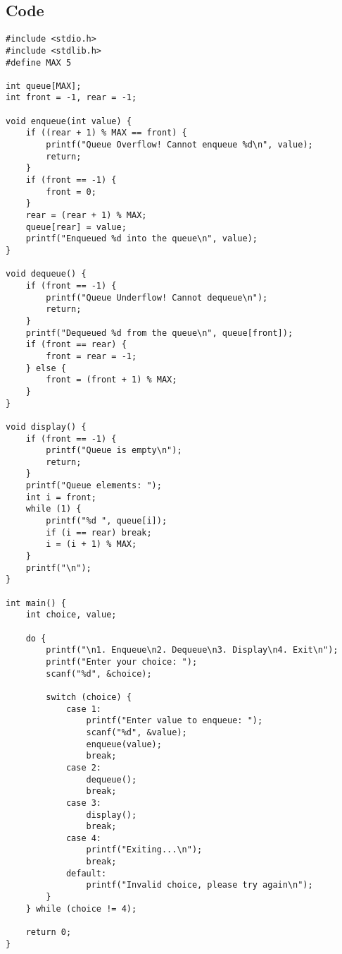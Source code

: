 \documentclass[12pt,a4paper]{article}
\begin{document}
\subsection*{Code}
\begin{lstlisting}
#include <stdio.h>
#include <stdlib.h>
#define MAX 5

int queue[MAX];
int front = -1, rear = -1;

void enqueue(int value) {
    if ((rear + 1) % MAX == front) {
        printf("Queue Overflow! Cannot enqueue %d\n", value);
        return;
    }
    if (front == -1) {
        front = 0;
    }
    rear = (rear + 1) % MAX;
    queue[rear] = value;
    printf("Enqueued %d into the queue\n", value);
}

void dequeue() {
    if (front == -1) {
        printf("Queue Underflow! Cannot dequeue\n");
        return;
    }
    printf("Dequeued %d from the queue\n", queue[front]);
    if (front == rear) {
        front = rear = -1;
    } else {
        front = (front + 1) % MAX;
    }
}

void display() {
    if (front == -1) {
        printf("Queue is empty\n");
        return;
    }
    printf("Queue elements: ");
    int i = front;
    while (1) {
        printf("%d ", queue[i]);
        if (i == rear) break;
        i = (i + 1) % MAX;
    }
    printf("\n");
}

int main() {
    int choice, value;

    do {
        printf("\n1. Enqueue\n2. Dequeue\n3. Display\n4. Exit\n");
        printf("Enter your choice: ");
        scanf("%d", &choice);

        switch (choice) {
            case 1:
                printf("Enter value to enqueue: ");
                scanf("%d", &value);
                enqueue(value);
                break;
            case 2:
                dequeue();
                break;
            case 3:
                display();
                break;
            case 4:
                printf("Exiting...\n");
                break;
            default:
                printf("Invalid choice, please try again\n");
        }
    } while (choice != 4);

    return 0;
}
\end{lstlisting}
\end{document}
